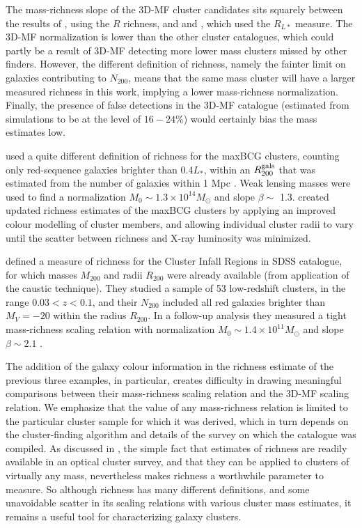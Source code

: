 The mass-richness slope of the \ac{3D-MF} cluster candidates sits squarely between the results of \citet{Wen09}, using the $R$ richness, and \citet{Wen12} and \citet{Covone14}, which used the $R_{L*}$ measure. The \ac{3D-MF} normalization is lower than the other cluster catalogues, which could partly be a result of \ac{3D-MF} detecting more lower mass clusters missed by other finders. However, the different definition of richness, namely the fainter limit on galaxies contributing to $N_{200}$, means that the same mass cluster will have a larger measured richness in this work, implying a lower mass-richness normalization. Finally, the presence of false detections in the \ac{3D-MF} catalogue (estimated from simulations to be at the level of $16-24$\%) would certainly bias the mass estimates low.

\citet{Johnston07} used a quite different definition of richness for the maxBCG clusters, counting only red-sequence galaxies brighter than 0.4$L_*$, within an $R_{200}^{\rm gals}$ that was estimated from the number of galaxies within 1 Mpc \citep[following a prescription in][]{Hansen05}. Weak lensing masses were used to find a normalization $M_0 \sim 1.3 \times 10^{14} M_{\odot}$ and slope $\beta \sim$ 1.3. \citet{Rozo09b} created updated richness estimates of the maxBCG clusters by applying an improved colour modelling of cluster members, and allowing individual cluster radii to vary until the scatter between richness and X-ray luminosity was minimized.

\citet{Andreon10} defined a measure of richness for the Cluster Infall Regions in SDSS catalogue, for which masses $M_{200}$ and radii $R_{200}$ were already available (from application of the caustic technique). They studied a sample of 53 low-redshift clusters, in the range $0.03 < z < 0.1$, and their $N_{200}$ included all red galaxies brighter than $M_V = -20$ within the radius $R_{200}$. In a follow-up analysis they measured a tight mass-richness scaling relation with normalization $M_0 \sim 1.4 \times 10^{11} M_{\odot}$ and slope $\beta \sim 2.1$ \citep{Andreon12}.

The addition of the galaxy colour information in the richness estimate of the previous three examples, in particular, creates difficulty in drawing meaningful comparisons between their mass-richness scaling relation and the \ac{3D-MF} scaling relation. We emphasize that the value of any mass-richness relation is limited to the particular cluster sample for which it was derived, which in turn depends on the cluster-finding algorithm and details of the survey on which the catalogue was compiled. As discussed in \citet{Rozo09b}, the simple fact that estimates of richness are readily available in an optical cluster survey, and that they can be applied to clusters of virtually any mass, nevertheless makes richness a worthwhile parameter to measure. So although richness has many different definitions, and some unavoidable scatter in its scaling relations with various cluster mass estimates, it remains a useful tool for characterizing galaxy clusters. 

